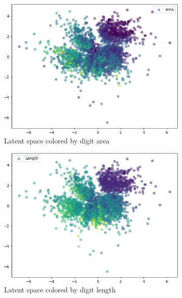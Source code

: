 \begin{figure}
    \hfill
    \begin{subfigure}{.32\textwidth}
        \includegraphics[width=\textwidth]{images/latent_spaces/mnist/vae/embeddings_mu_2.png}
        \caption{Latent space colored by digit area}
        \label{subfig:vae_mnist_latent_space_area}
    \end{subfigure}
    \hfill
    \begin{subfigure}{.24\textwidth}
        \includegraphics[width=\textwidth]{images/latent_spaces/mnist/vae/embeddings_mu_3.png}
        \caption{Latent space colored by digit length}
        \label{subfig:vae_mnist_latent_space_length}
    \end{subfigure}
    \hfill
    \begin{subfigure}{.24\textwidth}

\end{subfigure}
\end{figure}
